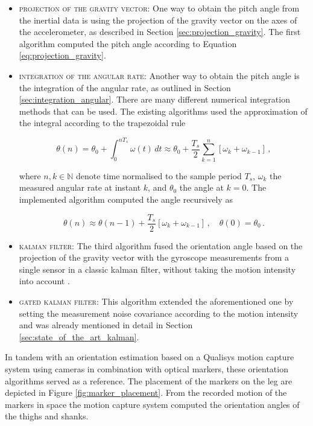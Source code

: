 \begin{itemize}
  \item \textsc{projection of the gravity vector:} One way to obtain the pitch angle from the inertial data is using the projection of the gravity vector on the axes of the accelerometer, as described in Section \ref{sec:projection_gravity}. The first algorithm computed the pitch angle according to Equation \ref{eq:projection_gravity}.
  
  \item \textsc{integration of the angular rate:} Another way to obtain the pitch angle is the integration of the angular rate, as outlined in Section \ref{sec:integration_angular}. There are many different numerical integration methods that can be used. The existing algorithms used the approximation of the integral according to the trapezoidal rule
  
  \begin{equation}
   \theta(n) = \theta_0 + \int_{0}^{n T_s} \omega(t)\, dt \approx \theta_0 + \frac{T_s}{2} \sum_{k=1}^{n} \left[ \omega_{k} + \omega_{k-1} \right]\,,
  \end{equation}
  
  \noindent
  where $n, k \in \mathbb{N}$ denote time normalised to the sample period $T_s$, $\omega_k$ the measured angular rate at instant $k$, and $\theta_0$ the angle at $k=0$. The implemented algorithm computed the angle recursively as
  
   \begin{equation}
   \theta(n) \approx \theta(n-1) + \frac{T_s}{2} \left[ \omega_{k} + \omega_{k-1} \right]\,, \quad \theta(0) = \theta_{0}\,.
  \end{equation}
  
  \item \textsc{kalman filter:} The third algorithm fused the orientation angle based on the projection of the gravity vector with the gyroscope measurements from a single sensor in a classic kalman filter, without taking the motion intensity into account \cite{olivares_vicente_gaitwatch_2013}.
  
  \item \textsc{gated kalman filter:} This algorithm extended the aforementioned one by setting the measurement noise covariance according to the motion intensity \cite{olivares_vicente_gaitwatch_2013} and was already mentioned in detail in Section \ref{sec:state_of_the_art_kalman}.
  \end{itemize}

In tandem with an orientation estimation based on a Qualisys motion capture system using cameras in combination with optical markers, these orientation algorithms served as a reference. The placement of the markers on the leg are depicted in Figure \ref{fig:marker_placement}. From the recorded motion of the markers in space the motion capture system computed the orientation angles of the thighs and shanks.

